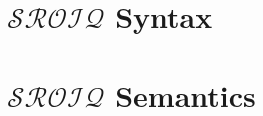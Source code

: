 \section{\texorpdfstring{$\mathcal{SROIQ}$}{SROIQ} Syntax} \label{sroiq-syntax}



\section{\texorpdfstring{$\mathcal{SROIQ}$}{SROIQ} Semantics} \label{sroiq-semantics}



